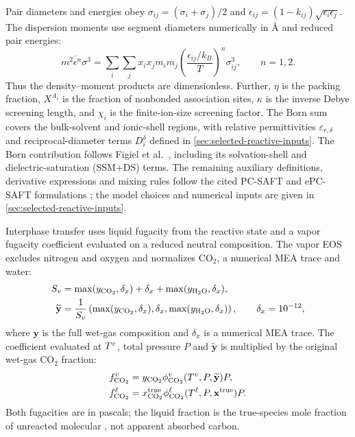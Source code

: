 Pair diameters and energies obey $\sigma_{ij}=(\sigma_i+\sigma_j)/2$ and $\epsilon_{ij}=(1-k_{ij})\sqrt{\epsilon_i\epsilon_j}$.
The dispersion moments use segment diameters numerically in \unit{\angstrom} and reduced pair energies:
\begin{equation}
\overline{m^2\epsilon^n\sigma^3}
=\sum_i\sum_j x_i x_j m_i m_j
\left(\frac{\epsilon_{ij}/k_B}{T}\right)^n\sigma_{ij}^3,
\qquad n=1,2.
\end{equation}
Thus the density--moment products are dimensionless.
Further, $\eta$ is the packing fraction, $X^{A_i}$ is the fraction of nonbonded association sites, $\kappa$ is the inverse Debye screening length, and $\chi_i$ is the finite-ion-size screening factor.
The Born sum covers the bulk-solvent and ionic-shell regions, with relative permittivities $\varepsilon_{r,\delta}$ and reciprocal-diameter terms $D_i^{\delta}$ defined in \cref{sec:selected-reactive-inputs}.
The Born contribution follows Figiel et al.\ \cite{Figiel2025}, including its solvation-shell and dielectric-saturation (SSM+DS) terms.
The remaining auxiliary definitions, derivative expressions and mixing rules follow the cited PC-SAFT and ePC-SAFT formulations \cite{Gross2001,Cameretti2005,Bulow2019,Bulow2020,Bulow2021a}; the model choices and numerical inputs are given in \cref{sec:selected-reactive-inputs}.

Interphase \COtwo{} transfer uses liquid fugacity from the reactive state and a vapor fugacity coefficient evaluated on a reduced neutral composition.
The vapor EOS excludes nitrogen and oxygen and normalizes CO$_2$, a numerical MEA trace and water:
\begin{align}
S_v&=\max(y_{\COtwo},\delta_x)+\delta_x+\max(y_{\HtwoO},\delta_x),\\
\widetilde{\mathbf y}&=\frac{1}{S_v}
\left(\max(y_{\COtwo},\delta_x),\delta_x,\max(y_{\HtwoO},\delta_x)\right),
\qquad\delta_x=10^{-12},\label{eq:reduced-vapor}\end{align}
where $\mathbf y$ is the full wet-gas composition and $\delta_x$ is a numerical MEA trace.
The coefficient evaluated at $T^v$, total pressure $P$ and $\widetilde{\mathbf y}$ is multiplied by the original wet-gas CO$_2$ fraction:
\begin{align}
f_{\COtwo}^{\vap}&=y_{\COtwo}\phi_{\COtwo}^{\vap}(T^\vap,P,\widetilde{\mathbf y})P,\\
f_{\COtwo}^{\liq}&=x_{\COtwo}^{\mathrm{true}}\phi_{\COtwo}^{\liq}(T^\liq,P,\mathbf x^{\mathrm{true}})P.
\label{eq:co2-fugacity}
\end{align}
Both fugacities are in pascals; the liquid fraction is the true-species mole fraction of unreacted molecular \COtwo{}, not apparent absorbed carbon.

